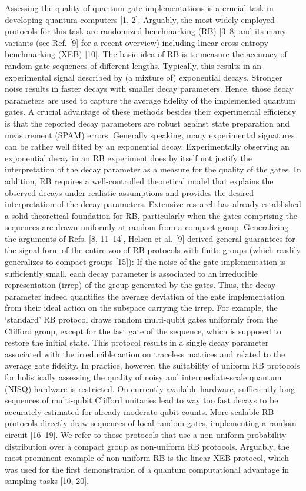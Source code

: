 Assessing the quality of quantum gate implementations is a crucial task in developing quantum computers [1, 2]. Arguably, the most widely employed protocols for this task are randomized benchmarking (RB) [3–8] and its many variants (see Ref. [9] for a recent overview) including linear cross-entropy benchmarking (XEB) [10]. The basic idea of RB is to measure the accuracy of random gate sequences of different lengths. Typically, this results in an experimental signal described by (a mixture of) exponential decays. Stronger noise results in faster decays with smaller decay parameters. Hence, those decay parameters are used to capture the average fidelity of the implemented quantum gates. A crucial advantage of these methods besides their experimental efficiency is that the reported decay parameters are robust against state preparation and measurement (SPAM) errors. Generally speaking, many experimental signatures can be rather well fitted by an exponential decay. Experimentally observing an exponential decay in an RB experiment does by itself not justify the interpretation of the decay parameter as a measure for the quality of the gates. In addition, RB requires a well-controlled theoretical model that explains the observed decays under realistic assumptions and provides the desired interpretation of the decay parameters. Extensive research has already established a solid theoretical foundation for RB, particularly when the gates comprising the sequences are drawn uniformly at random from a compact group. Generalizing the arguments of Refs. [8, 11–14], Helsen et al. [9] derived general guarantees for the signal form of the entire zoo of RB protocols with finite groups (which readily generalizes to compact groups [15]): If the noise of the gate implementation is sufficiently small, each decay parameter is associated to an irreducible representation (irrep) of the group generated by the gates. Thus, the decay parameter indeed quantifies the average deviation of the gate implementation from their ideal action on the subspace carrying the irrep. For example, the ‘standard’ RB protocol draws random multi-qubit gates uniformly from the Clifford group, except for the last gate of the sequence, which is supposed to restore the initial state. This protocol results in a single decay parameter associated with the irreducible action on traceless matrices and related to the average gate fidelity. In practice, however, the suitability of uniform RB protocols for holistically assessing the quality of noisy and intermediate-scale quantum (NISQ) hardware is restricted. On currently available hardware, sufficiently long sequences of multi-qubit Clifford unitaries lead to way too fast decays to be accurately estimated for already moderate qubit counts. More scalable RB protocols directly draw sequences of local random gates, implementing a random circuit [16–19]. We refer to those protocols that use a non-uniform probability distribution over a compact group as non-uniform RB protocols. Arguably, the most prominent example of non-uniform RB is the linear XEB protocol, which was used for the first demonstration of a quantum computational advantage in sampling tasks [10, 20].


